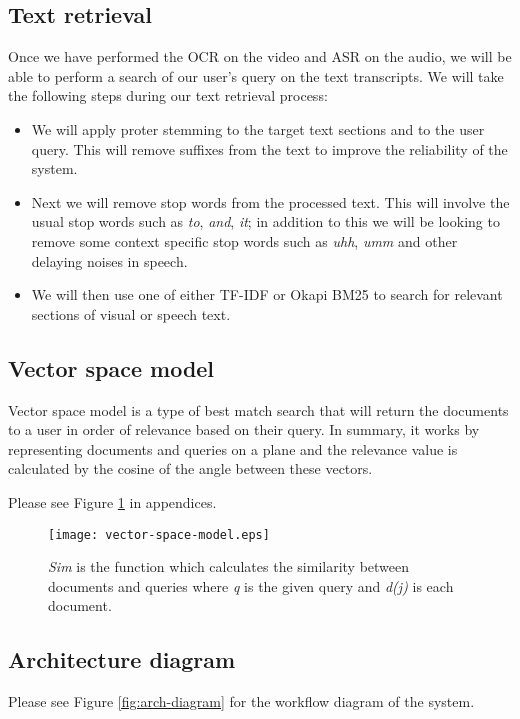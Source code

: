 \documentclass[a4paper,12pt]{article}
\begin{document}
\subsection{Text retrieval}
Once we have performed the OCR on the video and ASR on the audio, we will be able to perform a search of our user's query on the text transcripts. We will take the following steps during our text retrieval process:

\begin{itemize}
\item
We will apply proter stemming\cite{porter_stem} to the target text sections and to the user query. This will remove suffixes from the text to improve the reliability of the system.

\item
Next we will remove stop words from the processed text. This will involve the usual stop words such as \textit{to}, \textit{and}, \textit{it}; in addition to this we will be looking to remove some context specific stop words such as \textit{uhh}, \textit{umm} and other delaying noises in speech.

\item
We will then use one of either TF-IDF\cite{tf_idf} or Okapi BM25\cite{bm_25} to search for relevant sections of visual or speech text.
\end{itemize}

\subsection{Vector space model}
Vector space model is a type of best match search that will return the documents to a user in order of relevance based on their query. In summary, it works by representing documents and queries on a plane and the relevance value is calculated by the cosine of the angle between these vectors.\cite{tf_idf}

Please see Figure \ref{fig:vector} in appendices.

\begin{figure}[h]
\centering
\texttt{[image: vector-space-model.eps]}
\caption{\textit{Sim} is the function which calculates the similarity between documents and queries where \textit{q} is the given query and \textit{d(j)} is each document.\cite{tf_idf}}
\label{fig:vector}
\end{figure}


\subsection{Architecture diagram}
Please see Figure \ref{fig:arch-diagram} for the workflow diagram of the system.
\end{document}
